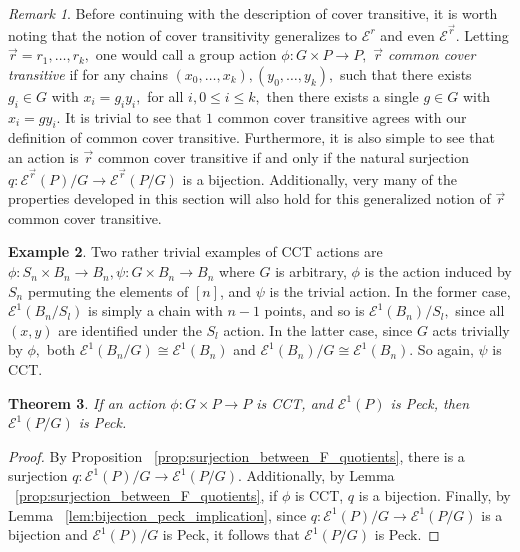 \documentclass[10 pt]{amsart}
\theoremstyle{plain}
\newtheorem{thm}{Theorem}[section]
\theoremstyle{definition}
\newtheorem{eg}[thm]{Example}
\theoremstyle{remark}
\newtheorem{rem}[thm]{Remark}
\numberwithin{equation}{section}
\renewcommand{\vec}[1]{\overrightarrow{#1}}
\begin{document}
\begin{rem}
Before continuing with the description of cover transitive, it is worth noting that the notion of cover transitivity generalizes to $\mathcal E^r$ and even $\mathcal E^{\vec r}.$ Letting $\vec r = r_1,\ldots, r_k,$ one would call a group action $\phi:G\times P \rightarrow P,$ {\it $\vec r$ common cover transitive} if for any chains $(x_0,\ldots, x_k),(y_0,\ldots, y_k),$ such that there exists $g_i \in G$ with $x_i = g_i y_i,$ for all $i,0\leq i \leq k,$ then there exists a single $g \in G$ with $x_i = g y_i.$ It is trivial to see that $1$ common cover transitive agrees with our definition of common cover transitive. Furthermore, it is also simple to see that an action is $\vec r$ common cover transitive if and only if the natural surjection $q:\mathcal E^{\vec r}(P)/G \rightarrow \mathcal E^{\vec r}(P/G)$ is a bijection. Additionally, very many of the properties developed in this section will also hold for this generalized notion of $\vec r$ common cover transitive.
\end{rem}

\begin{eg}
\label{eg:trivial_edgequot}
Two rather trivial examples of CCT actions are $\phi:S_n\times B_n \rightarrow B_n,\psi:G\times B_n\rightarrow B_n$ where $G$ is arbitrary, $\phi$ is the action induced by $S_n$ permuting the elements of $[n]$, and $\psi$ is the trivial action. In the former case, $\mathcal E^1(B_n/S_l)$ is simply a chain with $n-1$ points, and so is $\mathcal E^1(B_n)/S_l,$ since all $(x, y)$ are identified under the $S_l$ action. In the latter case, since $G$ acts trivially by $\phi,$ both  $\mathcal E^1(B_n/G) \cong \mathcal E^1(B_n)$ and $\mathcal E^1(B_n)/G \cong \mathcal E^1(B_n).$ So again, $\psi$ is CCT.
\end{eg}

\begin{thm}
If an action $\phi:G \times P \rightarrow P$ is CCT, and $\mathcal E^1(P)$ is Peck, then $\mathcal E^1(P/G)$ is Peck.
\end{thm}
\begin{proof}
By Proposition ~\ref{prop:surjection_between_F_quotients}, there is a surjection $q:\mathcal E^1(P)/G \rightarrow \mathcal E^1(P/G).$ Additionally, by Lemma ~\ref{prop:surjection_between_F_quotients}, if $\phi$ is CCT, $q$ is a bijection. Finally, by Lemma ~\ref{lem:bijection_peck_implication}, since $q:\mathcal E^1(P)/G \rightarrow \mathcal E^1(P/G)$ is a bijection and $\mathcal E^1(P)/G$ is Peck, it follows that $\mathcal E^1(P/G)$ is Peck.
\end{proof}
\end{document}
